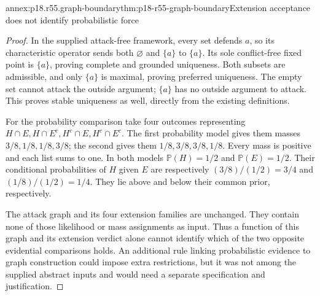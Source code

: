 \begin{annexitem}{annex:p18.r55.graph-boundary}{thm:p18-r55-graph-boundary}{Extension acceptance does not identify probabilistic force}
\begin{proof}
In the supplied attack-free framework, every set defends \(a\),
so its characteristic operator sends both \(\varnothing\)
and \(\{a\}\) to \(\{a\}\). Its sole conflict-free
fixed point is \(\{a\}\), proving complete and grounded
uniqueness. Both subsets are admissible, and only \(\{a\}\)
is maximal, proving preferred uniqueness. The empty set cannot
attack the outside argument; \(\{a\}\) has no outside argument
to attack. This proves stable uniqueness as well, directly from
the existing definitions.

For the probability comparison take four outcomes representing
\(H\cap E,H\cap E^c,H^c\cap E,H^c\cap E^c\).
The first probability model gives them masses
\(3/8,1/8,1/8,3/8\); the second gives them
\(1/8,3/8,3/8,1/8\). Every mass is positive and each list
sums to one. In both models \(\mathbb P(H)=1/2\) and
\(\mathbb P(E)=1/2\). Their conditional probabilities of
\(H\) given \(E\) are respectively
\((3/8)/(1/2)=3/4\) and \((1/8)/(1/2)=1/4\).
They lie above and below their common prior, respectively.

The attack graph and its four extension families are unchanged.
They contain none of those likelihood or mass assignments as input.
Thus a function of this graph and its extension verdict alone cannot
identify which of the two opposite evidential comparisons holds.
An additional rule linking probabilistic evidence to graph construction
could impose extra restrictions, but it was not among the supplied
abstract inputs and would need a separate specification and justification.
\end{proof}
\end{annexitem}
